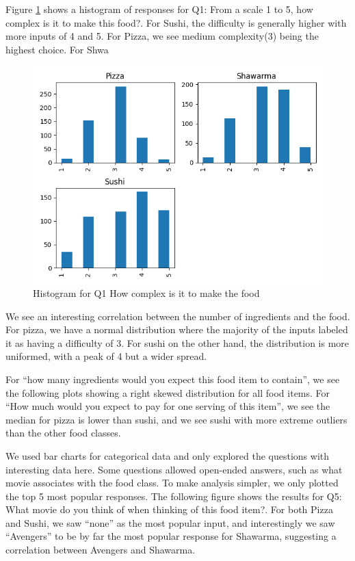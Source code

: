 Figure \ref{f:hist_q1} shows a histogram of responses for Q1: From a scale 1 to 5, how complex is it to make this food?. For Sushi, 
the difficulty is generally higher with more inputs of 4 and 5. For Pizza, we see medium complexity(3) being the highest choice. For Shwa


\begin{figure}[h]
    \centerline{\includegraphics[width=\columnwidth]{data/histogram_Q1}}
    \caption{Histogram for Q1 How complex is it to make the food}
    \label{f:hist_q1}
\end{figure}

We see an interesting correlation between the number of ingredients and the food. For pizza, we have a normal 
distribution where the majority of the inputs labeled it as having a difficulty of 3. For sushi on the other hand, 
the distribution is more uniformed, with a peak of 4 but a wider spread.

For “how many ingredients would you expect this food item to contain”, we see the following plots showing a right skewed distribution for all food items.
For “How much would you expect to pay for one serving of this item”, we see the median for pizza is lower than sushi, and we see 
sushi with more extreme outliers than the other food classes.

We used bar charts for categorical data and only explored the questions with interesting data here. Some questions allowed open-ended answers, 
such as what movie associates with the food class. To make analysis simpler, we only plotted the top 5 most popular responses.
The following figure shows the results for Q5: What movie do you think of when thinking of this food item?. For both Pizza and Sushi, we saw 
“none” as the most popular input, and interestingly we saw “Avengers” to be by far the most popular response for Shawarma, suggesting a correlation 
between Avengers and Shawarma.

